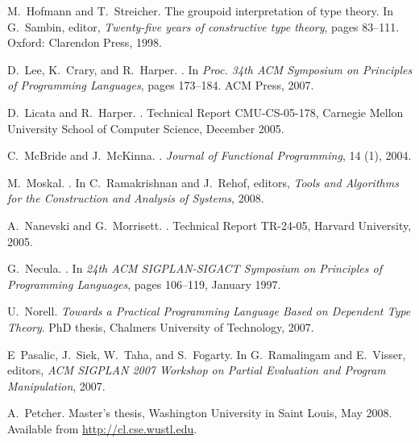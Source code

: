 \documentclass[9pt,natbib]{sigplanconf}
\begin{document}
\begin{thebibliography}{28}
M.~Hofmann and T.~Streicher.
\newblock The groupoid interpretation of type theory.
\newblock In G.~Sambin, editor, \emph{Twenty-five years of constructive type
  theory}, pages 83--111. Oxford: Clarendon Press, 1998.

D.~Lee, K.~Crary, and R.~Harper.
.
\newblock In \emph{{Proc. 34th ACM Symposium on Principles of Programming
  Languages}}, pages 173--184. ACM Press, 2007.

D.~Licata and R.~Harper.
.
\newblock Technical Report CMU-CS-05-178, {Carnegie Mellon University School of
  Computer Science}, December 2005.

C.~McBride and J.~McKinna.
.
\newblock \emph{Journal of Functional Programming}, 14 (1), 2004.

M.~Moskal.
.
\newblock In C.~Ramakrishnan and J.~Rehof, editors, \emph{Tools and Algorithms
  for the Construction and Analysis of Systems}, 2008.

A.~Nanevski and G.~Morrisett.
.
\newblock Technical Report TR-24-05, Harvard University, 2005.

G.~Necula.
.
\newblock In \emph{24th ACM SIGPLAN-SIGACT Symposium on Principles of
  Programming Languages}, pages 106--119, January 1997.

U.~Norell.
\newblock \emph{{Towards a Practical Programming Language Based on Dependent
  Type Theory}}.
\newblock PhD thesis, {Chalmers University of Technology}, 2007.

E~Pasalic, J.~Siek, W.~Taha, and S.~Fogarty.
\newblock In G.~Ramalingam and E.~Visser, editors, \emph{ACM SIGPLAN 2007
  Workshop on Partial Evaluation and Program Manipulation}, 2007.

A.~Petcher.
\newblock Master's thesis, {Washington University in Saint Louis}, May 2008.
\newblock Available from \url{http://cl.cse.wustl.edu}.


\end{thebibliography}
\end{document}
